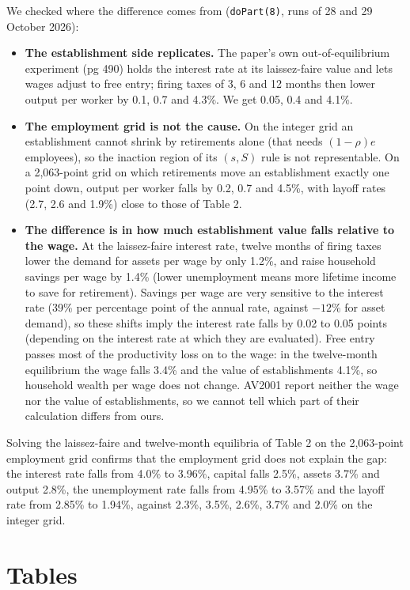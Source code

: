 \documentclass[11pt,fleqn]{article}
\begin{document}
We checked where the difference comes from (\verb|doPart(8)|, runs of 28 and 29 October 2026):
\begin{itemize}
\item \textbf{The establishment side replicates.} The paper's own out-of-equilibrium experiment (pg 490) holds the interest rate at its laissez-faire value and lets wages adjust to free entry; firing taxes of 3, 6 and 12 months then lower output per worker by 0.1, 0.7 and 4.3\%. We get 0.05, 0.4 and 4.1\%.
\item \textbf{The employment grid is not the cause.} On the integer grid an establishment cannot shrink by retirements alone (that needs $(1-\rho)e$ employees), so the inaction region of its $(s,S)$ rule is not representable. On a 2,063-point grid on which retirements move an establishment exactly one point down, output per worker falls by 0.2, 0.7 and 4.5\%, with layoff rates (2.7, 2.6 and 1.9\%) close to those of Table 2.
\item \textbf{The difference is in how much establishment value falls relative to the wage.} At the laissez-faire interest rate, twelve months of firing taxes lower the demand for assets per wage by only 1.2\%, and raise household savings per wage by 1.4\% (lower unemployment means more lifetime income to save for retirement). Savings per wage are very sensitive to the interest rate (39\% per percentage point of the annual rate, against $-12\%$ for asset demand), so these shifts imply the interest rate falls by 0.02 to 0.05 points (depending on the interest rate at which they are evaluated). Free entry passes most of the productivity loss on to the wage: in the twelve-month equilibrium the wage falls 3.4\% and the value of establishments 4.1\%, so household wealth per wage does not change. AV2001 report neither the wage nor the value of establishments, so we cannot tell which part of their calculation differs from ours.
\end{itemize}

Solving the laissez-faire and twelve-month equilibria of Table 2 on the 2,063-point employment grid confirms that the employment grid does not explain the gap: the interest rate falls from 4.0\% to 3.96\%, capital falls 2.5\%, assets 3.7\% and output 2.8\%, the unemployment rate falls from 4.95\% to 3.57\% and the layoff rate from 2.85\% to 1.94\%, against 2.3\%, 3.5\%, 2.6\%, 3.7\% and 2.0\% on the integer grid.

\clearpage

\section*{Tables}
\end{document}
